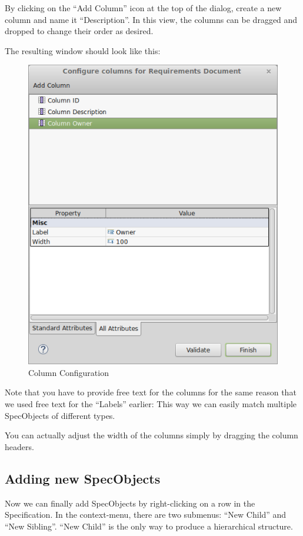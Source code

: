 By clicking on the ``Add Column'' icon at the top of the dialog, create a new column and name it ``Description''.  In this view, the columns can be dragged and dropped to change their order as desired.

The resulting window should look like this:

\begin{figure}[h!]
\centering      
\includegraphics[width=0.8\linewidth]{../rmf-images/columnconfig.png}      
\caption{Column Configuration}
\label{fig:column_configuration}
\end{figure}

Note that you have to provide free text for the columns for the same reason that we used free text for the ``Labels'' earlier: This way we can easily match multiple SpecObjects of different types.

You can actually adjust the width of the columns simply by dragging the column headers.

\subsection{Adding new SpecObjects}

Now we can finally add SpecObjects by right-clicking on a row in the Specification.  In the context-menu, there are two submenus: ``New Child'' and ``New Sibling''.  ``New Child'' is the only way to produce a hierarchical structure.


